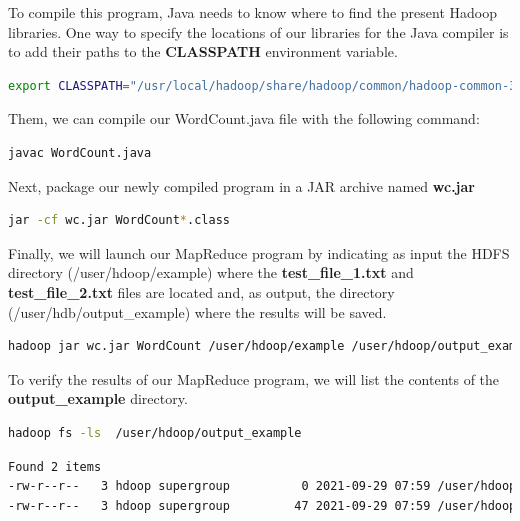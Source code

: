 \documentclass[12pt,english]{book}
\begin{document}
To compile this program, Java needs to know where to find the present Hadoop libraries.
One way to specify the locations of our libraries for the Java compiler is to add their paths to the \textbf{CLASSPATH} environment variable.

\begin{lstlisting}[language=bash, frame=single, breaklines=true, postbreak=\mbox{\textcolor{red}{$\hookrightarrow$}\space}]
export CLASSPATH="/usr/local/hadoop/share/hadoop/common/hadoop-common-3.3.1.jar:/usr/local/hadoop/share/hadoop/mapreduce/hadoop-mapreduce-client-common-3.3.1.jar:/usr/local/hadoop/share/hadoop/common/lib/commons-cli-1.2.jar:/usr/local/hadoop/share/hadoop/mapreduce/hadoop-mapreduce-client-core-3.3.1.jar"
\end{lstlisting}

Them, we can compile our WordCount.java file with the following command:

\begin{lstlisting}[language=bash, frame=single]
javac WordCount.java
\end{lstlisting}

Next, package our newly compiled program in a JAR archive named \textbf{wc.jar}

\begin{lstlisting}[language=bash, frame=single]
jar -cf wc.jar WordCount*.class
\end{lstlisting}

Finally, we will launch our MapReduce program by indicating as input the HDFS directory (/user/hdoop/example) where the \textbf{test\_file\_1.txt} and \textbf{test\_file\_2.txt} files are located and, as output, the directory (/user/hdb/output\_example)  where the results will be saved.

\begin{lstlisting}[language=bash, frame=single]
hadoop jar wc.jar WordCount /user/hdoop/example /user/hdoop/output_example
\end{lstlisting}

To verify the results of our MapReduce program, we will list the contents of the \textbf{output\_example} directory.

\begin{lstlisting}[language=bash, frame=single]
hadoop fs -ls  /user/hdoop/output_example
\end{lstlisting}
\begin{lstlisting}[language=bash, frame=single]
Found 2 items
-rw-r--r--   3 hdoop supergroup          0 2021-09-29 07:59 /user/hdoop/output_example/_SUCCESS
-rw-r--r--   3 hdoop supergroup         47 2021-09-29 07:59 /user/hdoop/output_example/part-r-00000
\end{lstlisting}
\end{document}
